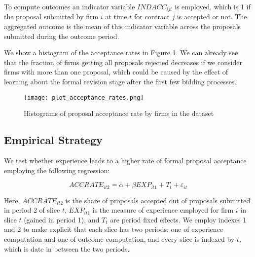 To compute outcomes an indicator variable $INDACC_{ijt}$ is employed, which is 1 if the proposal submitted by firm $i$ at time $t$ for contract $j$ is accepted or not. The aggregated outcome is the mean of this indicator variable across the proposals submitted during the outcome period.

We show a histogram of the acceptance rates in Figure \ref{fig:plot_acceptance_rates}. We can already see that the fraction of firms getting all proposals rejected decreases if we consider firms with more than one proposal, which could be caused by the effect of learning about the formal revision stage after the first few bidding processes.

\begin{figure}
  \texttt{[image: plot\_acceptance\_rates.png]}
  \caption{Histograms of proposal acceptance rate by firms in the dataset}
  \label{fig:plot_acceptance_rates}
\end{figure}

\subsection{Empirical Strategy}
We test whether experience leads to a higher rate of formal proposal acceptance employing the following regression:

\begin{equation}
\label{eqn:olsspec}
ACCRATE_{it2}=\alpha+ \beta EXP_{it1}+T_t+\varepsilon_{it}
\end{equation}

Here, $ACCRATE_{it2}$ is the share of proposals accepted out of proposals submitted in period 2 of slice $t$, $EXP_{it1} $ is the measure of experience employed for firm $i$ in slice $t$ (gained in period 1), and $T_t$ are period fixed effects. We employ indexes 1 and 2 to make explicit that each slice has two periods: one of experience computation and one of outcome computation, and every slice is indexed by $t$, which is date in between the two periods.




